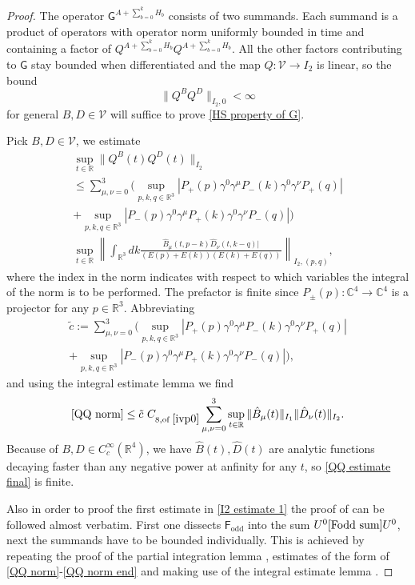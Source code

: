 \documentclass[b5paper,draft,openbib,12pt]{memoir}
\DeclareMathOperator{\odd}{odd}
\begin{document}
\begin{proof}
The operator \(\mathsf{G}^{A+\sum_{b=0}^k H_b}\) consists of 
two summands. Each summand is a product of operators 
with operator norm uniformly bounded in time and
containing a factor of 
\(Q^{A+\sum_{b=0}^k H_b} Q^{A+\sum_{b=0}^k H_b}\).
All the other factors contributing to \(\mathsf{G}\)
stay bounded when differentiated and
the map \(Q:\mathcal{V}\rightarrow I_2\) is 
linear, so the bound 
\begin{equation}
\|Q^{B} Q^{D}\|_{I_2,0}<\infty
\end{equation}
for general \(B,D\in\mathcal{V}\) will suffice to prove
\eqref{HS property of G}. 


Pick \(B,D\in\mathcal{V}\), we estimate 
\begin{align}\label{QQ norm}
\sup_{t\in \mathbb{R}}\| Q^B (t) Q^D(t)\|_{I_2}\\
\le \sum_{\mu,\nu=0}^3 
\big(\sup_{p,k,q\in\mathbb{R}^3} 
|P_+(p)\gamma^0\gamma^\mu P_-(k)\gamma^0\gamma^\nu P_+(q)|\\
+\sup_{p,k,q\in\mathbb{R}^3} 
|P_-(p)\gamma^0\gamma^\mu P_+(k)\gamma^0\gamma^\nu P_-(q)|\big)\\\label{QQ norm end}
\sup_{t\in\mathbb{R}}\left\| \int_{\mathbb{R}^3} dk 
\frac{\hat{B}_\mu (t,p-k)\hat{D}_\nu(t,k-q)|}{(E(p)+E(k))(E(k)+E(q))} 
\right\|_{I_2,(p,q)},
\end{align}
where the index in the norm indicates 
with respect to which variables the integral of the norm 
is to be performed. The prefactor is finite since 
\(P_\pm (p):\mathbb{C}^4\rightarrow\mathbb{C}^4\) 
is a projector for any \(p\in\mathbb{R}^3\).
Abbreviating 
\begin{align}
\tilde{c}:=\sum_{\mu,\nu=0}^3 
(\sup_{p,k,q\in\mathbb{R}^3} 
|P_+(p)\gamma^0\gamma^\mu P_-(k)\gamma^0\gamma^\nu P_+(q)|\\
+\sup_{p,k,q\in\mathbb{R}^3} 
|P_-(p)\gamma^0\gamma^\mu P_+(k)\gamma^0\gamma^\nu P_-(q)|),
\end{align}
and using the integral estimate lemma 
\cite[lemma 3.8 (iii)]{ivp0} we find
\begin{align}\label{QQ estimate final}
\eqref{QQ norm}\le 
\tilde{c}~ C_{8,\text{of }\cite{ivp0}} \sum_{\mu,\nu=0}^3 
\sup_{t\in\mathbb{R}}\|\hat{B}_\mu(t) \|_{I_1} \|\hat{D}_{\nu}(t) \|_{I_2}.
\end{align}
Because of 
\(B,D\in C_c^\infty(\mathbb{R}^4)\), we have
\(\hat{B}(t),\hat{D}(t)\) are analytic functions
decaying faster than any negative power at anfinity
for any \(t\), so \eqref{QQ estimate final} is finite. 

Also in order to proof the first estimate in 
\eqref{I2 estimate 1} the proof of \cite[lemma 3.7]{ivp0}
can be followed almost verbatim. 
First one dissects \(\mathsf{F}_{\odd}\) into the sum 
\(U^0\eqref{Fodd sum}U^0\),
next the summands have to be bounded individually.
This is achieved by repeating the proof of the
partial integration lemma \cite[lemma 3.6]{ivp0},
estimates of the form of \eqref{QQ norm}-\eqref{QQ norm end}
and making use of the integral estimate lemma 
\cite[lemma 3.8]{ivp0}.

\end{proof}
\end{document}
